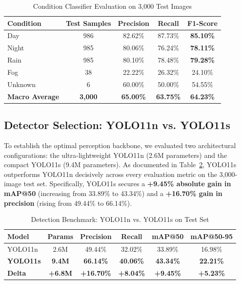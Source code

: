 \documentclass[conference]{IEEEtran}
\begin{document}
\begin{table}[htbp]
\caption{Condition Classifier Evaluation on 3,000 Test Images}
\label{tab:classifier_eval}
\centering
\small
\begin{tabular}{lcccc}
\toprule
\textbf{Condition} & \textbf{Test Samples} & \textbf{Precision} & \textbf{Recall} & \textbf{F1-Score} \\
\midrule
Day & 986 & 82.62\% & 87.73\% & \textbf{85.10\%} \\
Night & 985 & 80.06\% & 76.24\% & \textbf{78.11\%} \\
Rain & 985 & 80.10\% & 78.48\% & \textbf{79.28\%} \\
Fog & 38 & 22.22\% & 26.32\% & 24.10\% \\
Unknown & 6 & 60.00\% & 50.00\% & 54.55\% \\
\midrule
\textbf{Macro Average} & \textbf{3,000} & \textbf{65.00\%} & \textbf{63.75\%} & \textbf{64.23\%} \\
\bottomrule
\end{tabular}
\end{table}

\subsection{Detector Selection: YOLO11n vs. YOLO11s}
To establish the optimal perception backbone, we evaluated two architectural configurations: the ultra-lightweight YOLO11n (2.6M parameters) and the compact YOLO11s (9.4M parameters). As documented in Table~\ref{tab:detector_comp}, YOLO11s outperforms YOLO11n decisively across every evaluation metric on the 3,000-image test set. Specifically, YOLO11s secures a \textbf{+9.45\% absolute gain in mAP@50} (increasing from 33.89\% to 43.34\%) and a \textbf{+16.70\% gain in precision} (rising from 49.44\% to 66.14\%).

\begin{table}[htbp]
\caption{Detection Benchmark: YOLO11n vs. YOLO11s on Test Set}
\label{tab:detector_comp}
\centering
\small
\begin{tabular}{lccccc}
\toprule
\textbf{Model} & \textbf{Params} & \textbf{Precision} & \textbf{Recall} & \textbf{mAP@50} & \textbf{mAP@50-95} \\
\midrule
YOLO11n & 2.6M & 49.44\% & 32.02\% & 33.89\% & 16.98\% \\
\textbf{YOLO11s} & \textbf{9.4M} & \textbf{66.14\%} & \textbf{40.06\%} & \textbf{43.34\%} & \textbf{22.21\%} \\
\midrule
\textbf{Delta} & \textbf{+6.8M} & \textbf{+16.70\%} & \textbf{+8.04\%} & \textbf{+9.45\%} & \textbf{+5.23\%} \\
\bottomrule
\end{tabular}
\end{table}
\end{document}

